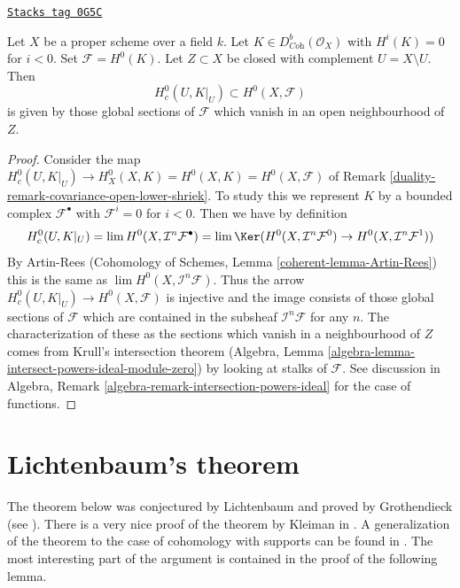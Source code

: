 \begin{lemma}
\label{duality-lemma-h0-compactly-supported}
\href{https://stacks.math.columbia.edu/tag/0G5C}{\texttt{Stacks tag 0G5C}}

Let $X$ be a proper scheme over a field $k$. Let
$K \in D^b_{\textit{Coh}}(\mathcal{O}_X)$ with $H^i(K) = 0$
for $i < 0$. Set $\mathcal{F} = H^0(K)$.
Let $Z \subset X$ be closed with complement $U = X \setminus U$.
Then
$$
H^0_c(U, K|_U) \subset H^0(X, \mathcal{F})
$$
is given by those global sections of $\mathcal{F}$ which
vanish in an open neighbourhood of $Z$.
\end{lemma}

\begin{proof}

Consider the map
$H^0_c(U, K|_U) \to H^0_X(X, K) = H^0(X, K) = H^0(X, \mathcal{F})$ of
Remark \ref{duality-remark-covariance-open-lower-shriek}. To study this
we represent $K$ by a bounded complex $\mathcal{F}^\bullet$ with
$\mathcal{F}^i = 0$ for $i < 0$. Then we have by definition
$$
H^0_c(U, K|_U) = \lim H^0(X, \mathcal{I}^n\mathcal{F}^\bullet)
= \lim \Ker(
H^0(X, \mathcal{I}^n\mathcal{F}^0) \to
H^0(X, \mathcal{I}^n\mathcal{F}^1))
$$
By Artin-Rees (Cohomology of Schemes, Lemma \ref{coherent-lemma-Artin-Rees})
this is the same as $\lim H^0(X, \mathcal{I}^n\mathcal{F})$.
Thus the arrow $H^0_c(U, K|_U) \to H^0(X, \mathcal{F})$
is injective and the image consists of those global sections of $\mathcal{F}$
which are contained in the subsheaf $\mathcal{I}^n\mathcal{F}$
for any $n$. The characterization of these as the sections which
vanish in a neighbourhood of $Z$ comes from Krull's intersection
theorem (Algebra, Lemma \ref{algebra-lemma-intersect-powers-ideal-module-zero})
by looking at stalks of $\mathcal{F}$. See discussion in
Algebra, Remark \ref{algebra-remark-intersection-powers-ideal}
for the case of functions.
\end{proof}

\section{Lichtenbaum's theorem}
\label{duality-section-lichtenbaum}
The theorem below was conjectured by Lichtenbaum and proved by Grothendieck
(see \cite{Hartshorne-local-cohomology}). There is a very nice proof of the
theorem by Kleiman in \cite{Kleiman-Lichtenbaum}. A generalization of
the theorem to the case of cohomology with supports can be found in
\cite{Lyubeznik-Lichtenbaum}. The most interesting part of the argument
is contained in the proof of the following lemma.

